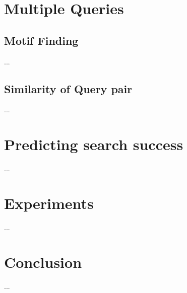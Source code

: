 \documentclass[sigconf,anonymous]{acmart}
\theoremstyle{definition}
\begin{document}
\section{Multiple Queries}\label{sec:multiple}
\subsection{Motif Finding}\label{sec:multiple:motif}
...
\subsection{Similarity of Query pair}\label{sec:multiple:simila}
...

\section{Predicting search success}\label{sec:predicting}
...

\section{Experiments}\label{sec:experiments}
...

\section{Conclusion}\label{sec:conclusion}
...
\end{document}
